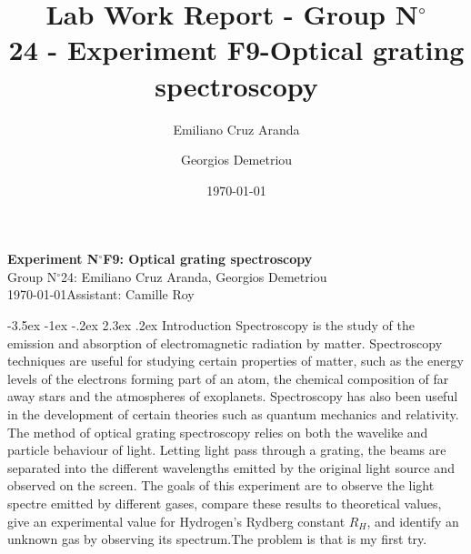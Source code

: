 \documentclass[a4paper, 12pt,oneside]{article}
\makeatletter
\renewcommand{\section}{\@startsection {section}{1}{\z@}%
             {-3.5ex \@plus -1ex \@minus -.2ex}%
             {2.3ex \@plus.2ex}%
             {\normalfont\normalsize\bfseries}}
\makeatother
\begin{document}
\title{\normalsize{Lab Work Report - Group N$^\circ$\\ 24 - Experiment F9-Optical grating spectroscopy}}
\date{\normalsize{\today}}
\author{\normalsize{Emiliano Cruz Aranda}\and \normalsize{Georgios Demetriou}}


\begin{center}
\large\textbf{\sffamily Experiment N$^\circ$F9: Optical grating spectroscopy}\\%
\large\sffamily Group N$^\circ$24: Emiliano Cruz Aranda, Georgios Demetriou\\%
\large\sffamily \today\qquad Assistant: Camille Roy\\%
\end{center}

\section{Introduction}
\vspace{-3mm}
Spectroscopy is the study of the emission and absorption of electromagnetic radiation by matter. Spectroscopy techniques are useful for studying certain properties of matter, such as the energy levels of the electrons forming part of an atom, the chemical composition of far away stars and the atmospheres of exoplanets. Spectroscopy has also been useful in the development of certain theories such as quantum mechanics and relativity\cite{Britannica}. The method of optical grating spectroscopy relies on both the wavelike and particle behaviour of light. Letting light pass through a grating, the beams are separated into the different wavelengths emitted by the original light source and observed on the screen. The goals of this experiment are to observe the light spectre emitted by different gases, compare these results to theoretical values, give an experimental value for Hydrogen's Rydberg constant $R_H$, and identify an unknown gas by observing its spectrum.The problem is that is my first try. 
\end{document}
